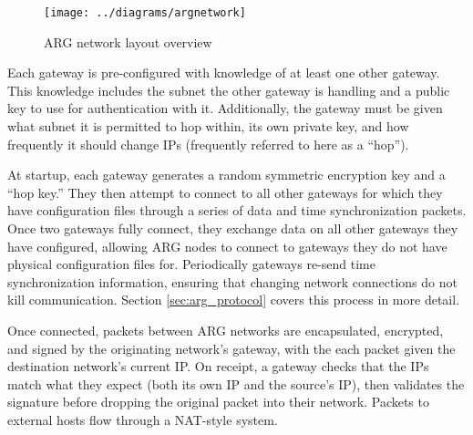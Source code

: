 \begin{figure}
	\centering
	\texttt{[image: ../diagrams/argnetwork]}
	\caption{ARG network layout overview}
	\label{fig:argnetwork}
\end{figure}

\par Each gateway is pre-configured with knowledge of at least one other gateway. This knowledge includes the subnet the other gateway is handling and a public key to use for authentication with it. Additionally, the gateway must be given what subnet it is permitted to hop within, its own private key, and how frequently it should change IPs (frequently referred to here as a ``hop'').

\par At startup, each gateway generates a random symmetric encryption key and a ``hop key.'' They then attempt to connect to all other gateways for which they have configuration files through a series of data and time synchronization packets. Once two gateways fully connect, they exchange data on all other gateways they have configured, allowing ARG nodes to connect to gateways they do not have physical configuration files for. Periodically gateways re-send time synchronization information, ensuring that changing network connections do not kill communication. Section \ref{sec:arg_protocol} covers this process in more detail.

\par Once connected, packets between ARG networks are encapsulated, encrypted, and signed by the originating network's gateway, with the each packet given the destination network's current IP. On receipt, a gateway checks that the IPs match what they expect (both its own IP and the source's IP), then validates the signature before dropping the original packet into their network. Packets to external hosts flow through a \ac{NAT}-style system. %


